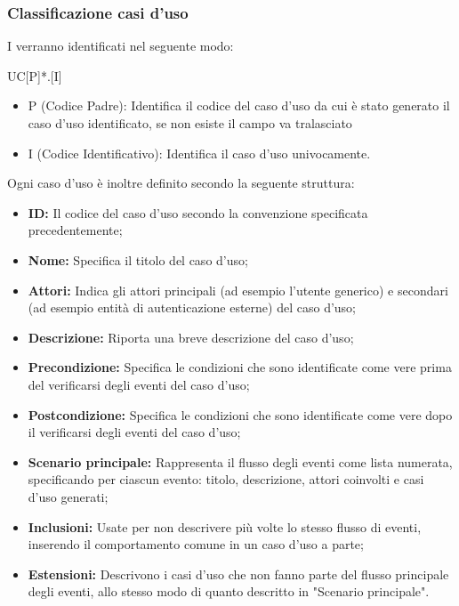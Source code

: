 \documentclass[../NomeDocumento.tex]{subfiles}
\begin{document}
	\subsubsection{Classificazione casi d’uso} 
	
	I  verranno identificati nel seguente modo: \centerline{UC[P]*.[I]}
	
	\begin{itemize}
		\item P (Codice Padre): Identifica il codice del caso d'uso da cui è stato generato il caso d'uso identificato, se non esiste il campo va tralasciato
		\item I (Codice Identificativo): Identifica il caso d'uso univocamente.
	\end{itemize}

	Ogni caso d'uso è inoltre definito secondo la seguente struttura:
	\begin{itemize}
		\item \textbf{ID:} Il codice del caso d'uso secondo la convenzione specificata precedentemente;
		\item \textbf{Nome:} Specifica il titolo del caso d'uso;
		\item \textbf{Attori:} Indica gli attori principali (ad esempio l'utente generico) e secondari (ad esempio entità di autenticazione esterne) del caso d'uso;
		\item \textbf{Descrizione:} Riporta una breve descrizione del caso d'uso;
		\item \textbf{Precondizione:} Specifica le condizioni che sono identificate come vere prima del verificarsi degli eventi del caso d'uso;
		\item \textbf{Postcondizione:} Specifica le condizioni che sono identificate come vere dopo il verificarsi degli eventi del caso d'uso;
		
		\item \textbf{Scenario principale:} Rappresenta il flusso degli eventi come lista numerata, specificando per ciascun evento: titolo, descrizione, attori coinvolti e casi d'uso generati;
		\item \textbf{Inclusioni:} Usate per non descrivere più volte lo stesso flusso di eventi, inserendo il comportamento comune in un caso d'uso a parte;
		\item \textbf{Estensioni:} Descrivono i casi d'uso che non fanno parte del flusso principale degli eventi, allo stesso modo di quanto descritto in "Scenario principale".
	\end{itemize}
\end{document}
